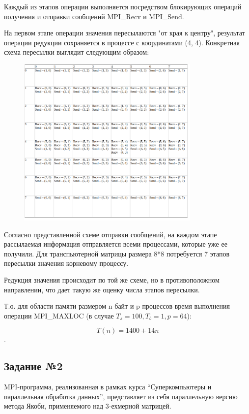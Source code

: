 \documentclass[a4paper]{article}
\begin{document}
Каждый из этапов операции выполняется посредством блокирующих операций получения и отправки сообщений MPI\_Recv и MPI\_Send.

На первом этапе операции значения пересылаются "от края к центру", результат операции редукции сохраняется в процессе с координатами (4, 4). Конкретная схема пересылки выглядит следующим образом:

\begin{figure}[htbp]
    \centering
    \includegraphics[width=0.8\textwidth]{pics/table.png}
\end{figure}

\newpage

Согласно представленной схеме отправки сообщений, на каждом этапе рассылаемая информация отправляется всеми процессами, которые уже ее получили. Для транспьютерной матрицы размера 8*8 потребуется 7 этапов пересылки значения корневому процессу.

Редукция значения происходит по той же схеме, но в противоположном направлении, что дает такую же оценку числа этапов пересылки.

Т.о. для области памяти размером n байт и p процессов время выполнения операции MPI\_MAXLOC (в случае $T_s = 100, T_b = 1, p = 64$):

$$ T(n) = 1400 + 14n $$.

\newpage

\subsection{Задание №2}

MPI-программа, реализованная в рамках курса “Суперкомпьютеры и параллельная обработка данных”, представляет из себя параллельную версию метода Якоби, применяемого над 3-ехмерной матрицей.
\end{document}
